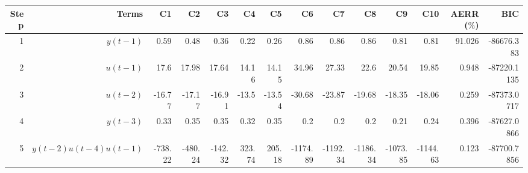 \begin{tabular}{rrrrrrrrrrrrrr}
Step & Terms & C1 & C2 & C3 & C4 & C5 & C6 & C7 & C8 & C9 & C10 & AERR($\%$) & BIC \\ 
\hline 
1 & $y(t-1)$ & 0.59 & 0.48 & 0.36 & 0.22 & 0.26 & 0.86 & 0.86 & 0.86 & 0.81 & 0.81 & 91.026 & -86676.383 \\ 
2 & $u(t-1)$ & 17.6 & 17.98 & 17.64 & 14.16 & 14.15 & 34.96 & 27.33 & 22.6 & 20.54 & 19.85 & 0.948 & -87220.1135 \\ 
3 & $u(t-2)$ & -16.77 & -17.17 & -16.91 & -13.5 & -13.54 & -30.68 & -23.87 & -19.68 & -18.35 & -18.06 & 0.259 & -87373.0717 \\ 
4 & $y(t-3)$ & 0.33 & 0.35 & 0.35 & 0.32 & 0.35 & 0.2 & 0.2 & 0.2 & 0.21 & 0.24 & 0.396 & -87627.0866 \\ 
5 & $y(t-2)u(t-4)u(t-1)$ & -738.22 & -480.24 & -142.32 & 323.74 & 205.18 & -1174.89 & -1192.34 & -1186.34 & -1073.85 & -1144.63 & 0.123 & -87700.7856 \\ 
\hline 
\end{tabular}